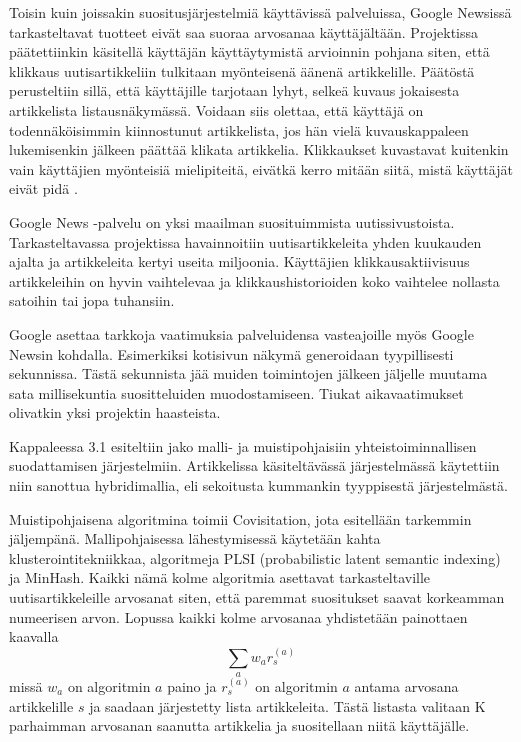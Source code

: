 \documentclass[12pt,finnish]{tktltiki2}
\theoremstyle{definition}
\theoremstyle{remark}
\begin{document}
Toisin kuin joissakin suositusjärjestelmiä käyttävissä palveluissa, Google Newsissä tarkasteltavat tuotteet eivät saa suoraa arvosanaa käyttäjältään. Projektissa päätettiinkin käsitellä käyttäjän käyttäytymistä arvioinnin pohjana siten, että klikkaus uutisartikkeliin tulkitaan myönteisenä äänenä artikkelille. Päätöstä perusteltiin sillä, että käyttäjille tarjotaan lyhyt, selkeä kuvaus jokaisesta artikkelista listausnäkymässä. Voidaan siis olettaa, että käyttäjä on todennäköisimmin kiinnostunut artikkelista, jos hän vielä kuvauskappaleen lukemisenkin jälkeen päättää klikata artikkelia. Klikkaukset kuvastavat kuitenkin vain käyttäjien myönteisiä mielipiteitä, eivätkä kerro mitään siitä, mistä käyttäjät eivät pidä \cite{Das:2007:GNP:1242572.1242610}.

Google News -palvelu on yksi maailman suosituimmista uutissivustoista. Tarkasteltavassa projektissa havainnoitiin uutisartikkeleita yhden kuukauden ajalta ja artikkeleita kertyi useita miljoonia. Käyttäjien klikkausaktiivisuus artikkeleihin on hyvin vaihtelevaa ja klikkaushistorioiden koko vaihtelee nollasta satoihin tai jopa tuhansiin.

Google asettaa tarkkoja vaatimuksia palveluidensa vasteajoille myös Google Newsin kohdalla. Esimerkiksi kotisivun näkymä generoidaan tyypillisesti sekunnissa. Tästä sekunnista jää muiden toimintojen jälkeen jäljelle muutama sata millisekuntia suositteluiden muodostamiseen. Tiukat aikavaatimukset olivatkin yksi projektin haasteista.

Kappaleessa 3.1 esiteltiin jako malli- ja muistipohjaisiin yhteistoiminnallisen suodattamisen järjestelmiin. Artikkelissa käsiteltävässä järjestelmässä käytettiin niin sanottua hybridimallia, eli sekoitusta kummankin tyyppisestä järjestelmästä.

Muistipohjaisena algoritmina toimii Covisitation, jota esitellään tarkemmin jäljempänä. Mallipohjaisessa lähestymisessä käytetään kahta klusterointitekniikkaa, algoritmeja PLSI (probabilistic latent semantic indexing) ja MinHash. Kaikki nämä kolme algoritmia asettavat tarkasteltaville uutisartikkeleille arvosanat siten, että paremmat suositukset saavat korkeamman numeerisen arvon. Lopussa kaikki kolme arvosanaa yhdistetään painottaen kaavalla
\begin{displaymath}
\sum_a{w_a r^{(a)}_{s}}
\end{displaymath}
missä $w_a$ on algoritmin $a$ paino ja $r^{(a)}_{s}$ on algoritmin $a$ antama arvosana artikkelille $s$ ja saadaan järjestetty lista artikkeleita. Tästä listasta valitaan K parhaimman arvosanan saanutta artikkelia ja suositellaan niitä käyttäjälle.
\end{document}
